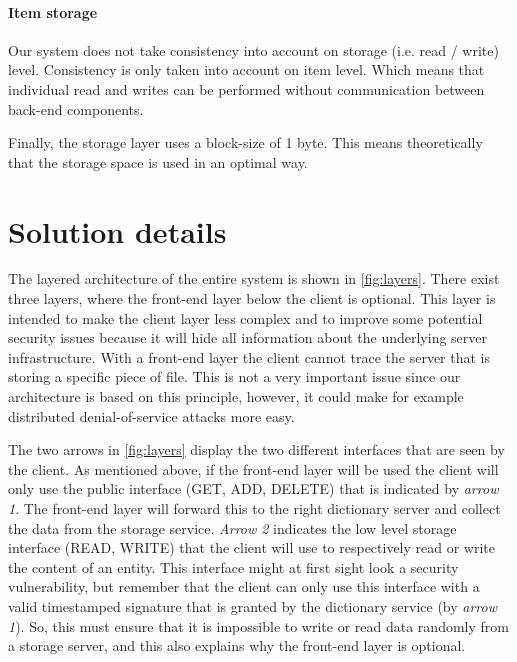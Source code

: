 \documentclass[12pt,a4paper]{scrartcl}
\begin{document}
\paragraph{Item storage}
Our system does not take consistency into account on storage (i.e. read / write) level. Consistency is only taken into account on item level. Which means that individual read and writes can be performed without communication between back-end components.

Finally, the storage layer uses a block-size of 1 byte. This means theoretically that the storage space is used in an optimal way.

\section{Solution details}
The layered architecture of the entire system is shown in \autoref{fig:layers}. There exist three layers, where the front-end layer below the client is optional. This layer is intended to make the client layer less complex and to improve some potential security issues because it will hide all information about the underlying server infrastructure. With a front-end layer the client cannot trace the server that is storing a specific piece of file. This is not a very important issue since our architecture is based on this principle, however, it could make for example distributed denial-of-service attacks more easy.

The two arrows in \autoref{fig:layers} display the two different interfaces that are seen by the client. As mentioned above, if the front-end layer will be used the client will only use the public interface (GET, ADD, DELETE) that is indicated by \emph{arrow 1}. The front-end layer will forward this to the right dictionary server and collect the data from the storage service. \emph{Arrow 2} indicates the low level storage interface (READ, WRITE) that the client will use to respectively read or write the content of an entity. This interface might at first sight look a security vulnerability, but remember that the client can only use this interface with a valid timestamped signature that is granted by the dictionary service (by \emph{arrow 1}). So, this must ensure that it is impossible to write or read data randomly from a storage server, and this also explains why the front-end layer is optional.
\end{document}
